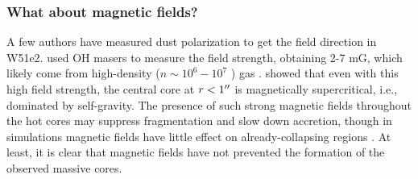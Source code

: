 \documentclass[twocolumn]{aastex61}
\begin{document}
\subsubsection{What about magnetic fields?}
A few authors \citep{Tang2009a,Tang2013a,Zhang2014a} have measured dust
polarization to get the field direction in W51e2.  \citet{Etoka2012a} used OH
masers to measure the field strength, obtaining 2-7 mG, which
likely come from high-density ($n\sim10^6-10^7$ \percc) gas \citep{Fish2003a}.
\citet{Koch2012a}
showed that even with this high field strength, the central core at
$r<1\mbox{$^{\prime\prime}$}$ is magnetically supercritical, i.e., dominated by self-gravity.
The presence of such strong magnetic fields throughout the hot cores may
suppress fragmentation and slow down accretion, though in simulations magnetic
fields have little effect on already-collapsing regions
\citep{Myers2013b,Krumholz2016a}.  At least, it is clear that magnetic fields
have not prevented the formation of the observed  massive cores.
\end{document}
